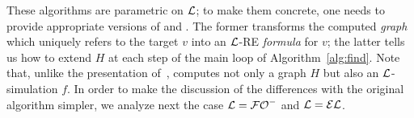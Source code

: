 %
These algorithms are parametric on $\mathcal{L}$; to make them concrete, one
needs to provide appropriate versions of  and
. The former transforms the computed {\em
graph} which uniquely refers to the target $v$ into an $\mathcal{L}$-RE {\em
formula} for $v$; the latter tells us how to extend $H$ at each step
of the main loop of Algorithm~\ref{alg:find}. Note that, unlike the
presentation of~\cite{Krahmer2003},  computes
not only a graph $H$ but also an $\mathcal{L}$-simulation $f$. %
%
%
%
%
%
%
%
%
%
In order to make the discussion of the differences with the original
algorithm simpler, we analyze next the case $\mathcal{L}={\mathcal{FO}^-}$ and $\mathcal{L}=\mathcal{EL}$.

%
%

